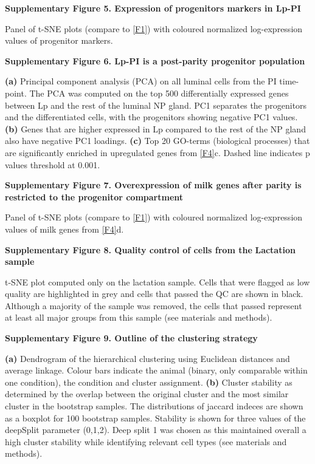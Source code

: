 \documentclass[titlepage, 12pt, oneside]{amsart}
\begin{document}
\textbf{Supplementary Figure 5. Expression of progenitors markers in Lp-PI}

Panel of t-SNE plots (compare to \autoref{F1}) with coloured normalized log-expression values of progenitor markers.

\textbf{Supplementary Figure 6. Lp-PI is a post-parity progenitor
population }

\textbf{(a)} Principal component analysis (PCA) on all luminal cells from the PI time-point.
The PCA was computed on the top 500 differentially expressed genes between Lp and the rest of the luminal NP gland.
PC1 separates the progenitors and the differentiated cells, with the progenitors showing negative PC1 values.
\textbf{(b)} Genes that are higher expressed in Lp compared to the rest of the NP gland also have negative PC1 loadings.
\textbf{(c)} Top 20 GO-terms (biological processes) that are significantly enriched in upregulated genes from \autoref{F4}c.
Dashed line indicates p values threshold at 0.001.

\textbf{Supplementary Figure 7. Overexpression of milk genes after
parity is restricted to the progenitor compartment}

Panel of t-SNE plots (compare to \autoref{F1}) with coloured normalized log-expression values of milk genes from \autoref{F4}d.

\textbf{Supplementary Figure 8. Quality control of cells from the}
\textbf{Lactation sample}

t-SNE plot computed only on the lactation sample.
Cells that were flagged as low quality are highlighted in grey and cells that passed the QC are shown in black.
Although a majority of the sample was removed, the cells that passed represent at least all major groups from this sample (see materials and methods).

\textbf{Supplementary Figure 9. Outline of the clustering strategy }

\textbf{(a)} Dendrogram of the hierarchical clustering using Euclidean distances and average linkage.
Colour bars indicate the animal (binary, only comparable within one condition), the condition and cluster assignment.
\textbf{(b)} Cluster stability as determined by the overlap between the original cluster and the most similar cluster in the bootstrap samples.
The distributions of jaccard indeces are shown as a boxplot for 100 bootstrap samples.
Stability is shown for three values of the deepSplit parameter (0,1,2).
Deep split 1 was chosen as this maintained overall a high cluster stability while identifying relevant cell types (see materials and methods).
\end{document}

